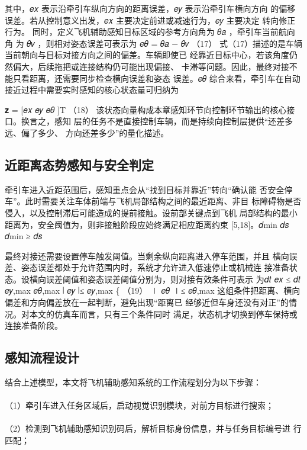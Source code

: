 其中，𝑒𝑥 表示沿牵引车纵向方向的距离误差，𝑒𝑦 表示沿牵引车横向方向
的偏移误差。若从控制意义出发，𝑒𝑥 主要决定前进或减速行为，𝑒𝑦 主要决定
转向修正行为。
同时，定义飞机辅助感知目标区域的参考方向角为 𝜃𝑎 ，牵引车当前航向角
为 𝜃𝑣 ，则相对姿态误差可表示为
𝑒𝜃 = 𝜃𝑎 − 𝜃𝑣                    （17）
式（17）描述的是车辆当前朝向与目标对接方向之间的偏差。车辆即使已
经靠近目标中心，若该角度仍然偏大，后续拖把或连接结构仍可能出现偏接、
卡滞等问题。因此，最终对接不能只看距离，还需要同步检查横向误差和姿态
误差。𝑒𝜃
综合来看，牵引车在自动接近过程中需要实时感知的核心状态量可归纳为






𝐳 = [𝑒𝑥   𝑒𝑦   𝑒𝜃 ]T   （18）
该状态向量构成本章感知环节向控制环节输出的核心接口。换言之，感知
层的任务不是直接控制车辆，而是持续向控制层提供“还差多远、偏了多少、
方向还差多少”的量化描述。
\subsection{近距离态势感知与安全判定}
牵引车进入近距范围后，感知重点会从“找到目标并靠近”转向“确认能
否安全停车”。此时需要关注车体前端与飞机局部结构之间的最近距离、非目
标障碍物是否侵入，以及控制滞后可能造成的提前接触。设前部关键点到飞机
局部结构的最小距离为，安全阈值为，则非接触阶段应始终满足相应距离约束
[5,18]。𝑑min 𝑑𝑠 𝑑min ≥ 𝑑𝑠


最终对接还需要设置停车触发阈值。当剩余纵向距离进入停车范围，并且
横向误差、姿态误差都处于允许范围内时，系统才允许进入低速停止或机械连
接准备状态。设横向误差阈值和姿态误差阈值分别为，则对接有效条件可表示
为𝑑𝑡 𝑒𝑥 ≤ 𝑑𝑡
𝑒𝑦,max 𝑒𝜃,max
∣ 𝑒𝑦 ∣≤ 𝑒𝑦,max
\{                    （19）
∣ 𝑒𝜃 ∣≤ 𝑒𝜃,max
这组条件把距离、横向偏差和方向偏差放在一起判断，避免出现“距离已
经够近但车身还没有对正”的情况。对本文的仿真车而言，只有三个条件同时
满足，状态机才切换到停车保持或连接准备阶段。


\subsection{感知流程设计}
结合上述模型，本文将飞机辅助感知系统的工作流程划分为以下步骤：
\paragraph{} （1）牵引车进入任务区域后，启动视觉识别模块，对前方目标进行搜索；
\paragraph{} （2）检测到飞机辅助感知识别码后，解析目标身份信息，并与任务目标编号进
行匹配；
